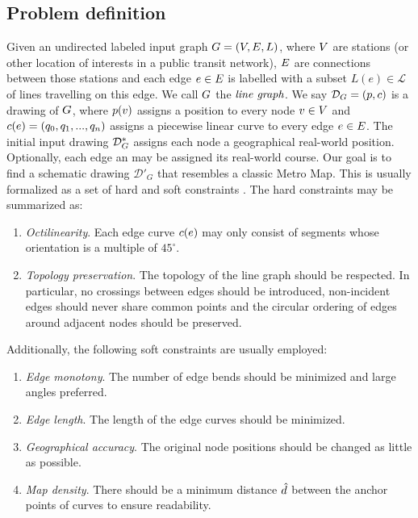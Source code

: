 \documentclass[sigconf]{acmart}
\begin{document}
\subsection{Problem definition}

Given an undirected labeled input graph $G = (V, E, L)$, where $V$ are stations (or other location of interests in a public transit network), $E$ are connections between those stations and each edge $e \in E$ is labelled with a subset $L(e) \in \mathcal{L}$ of lines travelling on this edge.
We call $G$ the $\emph{line graph}$.
We say $\mathcal{D}_{G} = (p, c)$ is a drawing of $G$, where $p(v)$ assigns a position to every node $v \in V$ and $c(e) = (q_0, q_1, ..., q_n)$ assigns a piecewise linear curve to every edge $e \in E$.
The initial input drawing $\mathcal{D}_{G}^*$ assigns each node a geographical real-world position.
Optionally, each edge an may be assigned its real-world course.
Our goal is to find a schematic drawing $\mathcal{D}'_G$ that resembles a classic Metro Map.
This is usually formalized as a set of hard and soft constraints \cite{nb, ...}.
The hard constraints may be summarized as:
%
\begin{enumerate}
\setlength\itemsep{.1em}
\item \emph{Octilinearity}. Each edge curve $c(e)$ may only consist of segments whose orientation is a multiple of $45^{\circ}$.
\item \emph{Topology preservation}. The topology of the line graph should be respected. In particular, no crossings between edges should be introduced, non-incident edges should never share common points and the circular ordering of edges around adjacent nodes should be preserved.
\end{enumerate}
%
Additionally, the following soft constraints are usually employed:
%
\begin{enumerate}
\setlength\itemsep{.1em}
\item \emph{Edge monotony}. The number of edge bends should be minimized and large angles preferred.
\item \emph{Edge length}. The length of the edge curves should be minimized.
\item \emph{Geographical accuracy}. The original node positions should be changed as little as possible.
\item \emph{Map density}. There should be a minimum distance $\hat d$ between the anchor points of curves to ensure readability.
\end{enumerate}
\end{document}
